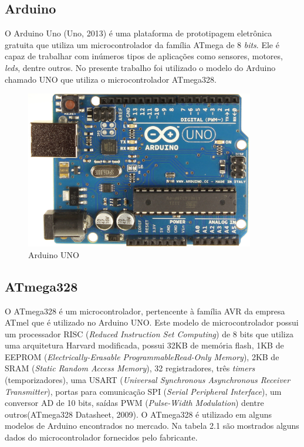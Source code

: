 \subsection{Arduino}
O Arduino Uno (Uno, 2013) é uma plataforma de prototipagem eletrônica gratuita que utiliza um microcontrolador da família ATmega de 8 \textit{bits}. Ele é capaz de trabalhar com inúmeros tipos de aplicações como sensores, motores, \textit{leds}, dentre outros. No presente trabalho foi utilizado o modelo do Arduino chamado UNO que utiliza o microcontrolador ATmega328.

\begin{figure}[h]

\center

\includegraphics[width=10cm]{imagens/arduino_uno.jpg}

\label{Arduino UNO}

\caption{Arduino UNO}

\end{figure}

\subsection{ATmega328}
O ATmega328 é um microcontrolador, pertencente à família AVR da empresa ATmel que é utilizado no Arduino UNO. Este modelo de microcontrolador possui um processador RISC (\textit{Reduced Instruction Set Computing}) de 8 bits que utiliza uma arquitetura Harvard modificada, possui 32KB de memória flash, 1KB de EEPROM (\textit{Electrically-Erasable ProgrammableRead-Only Memory}), 2KB de SRAM (\textit{Static Random Access Memory}), 32 registradores, três \textit{timers} (temporizadores), uma USART (\textit{Universal Synchronous Asynchronous Receiver Transmitter}), portas para comunicação SPI (\textit{Serial Peripheral Interface}), um conversor AD de 10 bits, saídas PWM (\textit{Pulse-Width Modulation}) dentre outros(ATmega328 Datasheet, 2009). O ATmega328 é utilizado em alguns modelos de Arduino encontrados no mercado. Na tabela 2.1 são mostrados alguns dados do microcontrolador fornecidos pelo fabricante.

